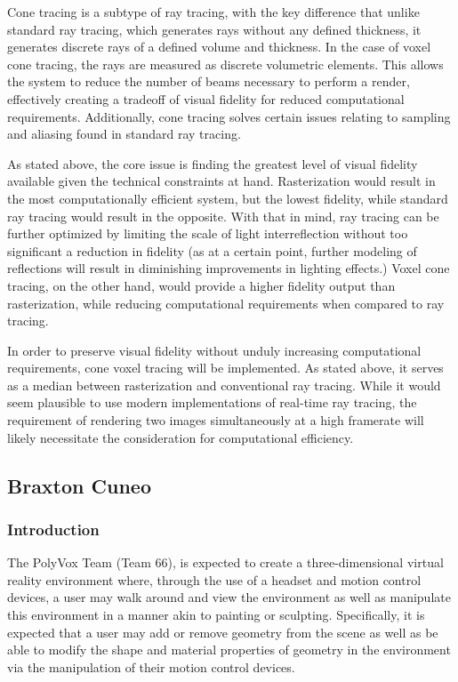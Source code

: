 \documentclass[onecolumn, draftclsnofoot,10pt, compsoc]{IEEEtran}
\newcounter{threesection}[subsubsection]
\newcounter{foursection}[threesection]
\begin{document}
Cone tracing is a subtype of ray tracing, with the key difference that unlike standard ray tracing, which generates rays without any defined thickness, it generates discrete rays of a defined volume and thickness. In the case of voxel cone tracing, the rays are measured as discrete volumetric elements. This allows the system to reduce the number of beams necessary to perform a render, effectively creating a tradeoff of visual fidelity for reduced computational requirements. Additionally, cone tracing solves certain issues relating to sampling and aliasing found in standard ray tracing.

As stated above, the core issue is finding the greatest level of visual fidelity available given the technical constraints at hand. Rasterization would result in the most computationally efficient system, but the lowest fidelity, while standard ray tracing would result in the opposite. With that in mind, ray tracing can be further optimized by limiting the scale of light interreflection without too significant a reduction in fidelity (as at a certain point, further modeling of reflections will result in diminishing improvements in lighting effects.) Voxel cone tracing, on the other hand, would provide a higher fidelity output than rasterization, while reducing computational requirements when compared to ray tracing.

In order to preserve visual fidelity without unduly increasing computational requirements, cone voxel tracing will be implemented. As stated above, it serves as a median between rasterization and conventional ray tracing. While it would seem plausible to use modern implementations of real-time ray tracing, the requirement of rendering two images simultaneously at a high framerate will likely necessitate the consideration for computational efficiency.



\pagebreak
\subsection{Braxton Cuneo}
\subsubsection{Introduction}

The PolyVox Team (Team 66), is expected to create a three-dimensional virtual reality environment where, through the use of a headset and motion control devices, a user may walk around and view the environment as well as manipulate this environment in a manner akin to painting or sculpting.
Specifically, it is expected that a user may add or remove geometry from the scene as well as be able to modify the shape and material properties of geometry in the environment via the manipulation of their motion control devices.
\end{document}
